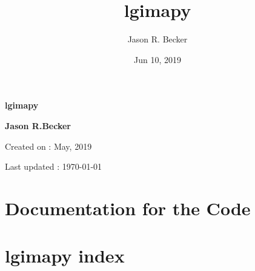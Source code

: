 \documentclass[letterpaper,10pt,english]{report}
\title{lgimapy}
\date{Jun 10, 2019}
\author{Jason R. Becker}
\begin{document}
\pagestyle{empty}


        \begin{titlepage}
            \centering

            \vspace*{40mm} %
            \textbf{\Huge {lgimapy}}

            \vspace{0mm}

            \vspace{0mm}
            \Large \textbf{{Jason R.Becker}}

            \small Created on : May, 2019

            \vspace*{0mm}
            \small  Last updated : \MonthYearFormat\today


            \vfill
        \end{titlepage}

        \clearpage
        \tableofcontents
        \listoffigures
        \listoftables
        \clearpage

        
\pagestyle{plain}
 
\pagestyle{normal}
\label{\detokenize{index::doc}}



\chapter{Documentation for the Code}
\label{\detokenize{index:documentation-for-the-code}}

\chapter{lgimapy index}
\label{\detokenize{index:module-lgimapy.index}}\label{\detokenize{index:lgimapy-index}}
\end{document}
